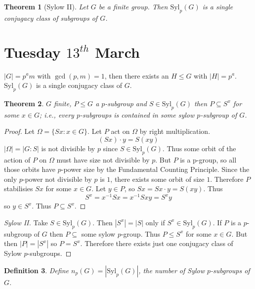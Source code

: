 \documentclass[a4paper,10pt]{article}
\newtheorem{thm}{Theorem}
\newtheorem{Def}[thm]{Definition}
\begin{document}
\begin{thm}[Sylow II]
Let $G$ be a finite group. Then $\text{Syl}_p(G)$ is a single conjugacy class of subgroups of $G$. 
\end{thm}













\newpage
\section{Tuesday $13^{th}$ March}

$|G| = p^a m$ with $\gcd(p, m) =1$, then there exists an $H \leq G$ with $|H| = p^a$. $\text{Syl}_p(G)$ is a single conjugacy class of $G$. 

\begin{thm}
$G$ finite, $P \leq G$ a $p$-subgroup and $S \in \text{Syl}_p(G)$ then $P \subseteq S^x$ for some $x \in G$; i.e., every $p$-subgroups is contained in some sylow $p$-subgroup of $G$.
\end{thm}

\begin{proof}
Let $\Omega = \{ Sx : x \in G\}$. Let $P$ act on $\Omega$ by right multiplication. 
\[ (Sx) \cdot y = S(xy) \]
$|\Omega| = |G : S|$ is not divisible by $p$ since $S \in \text{Syl}_p(G)$. Thus some orbit of the action of $P$ on $\Omega$ must have size not divisible by $p$. But $P$ is a p-group, so all those orbits have $p$-power size by the  Fundamental Counting Principle. Since the only $p$-power not divisible by $p$ is $1$, there exists some orbit of size $1$. Therefore $P$ stabilisies $Sx$ for some $x \in G$. Let $y \in P$, so $Sx = Sx \cdot y = S(xy)$. Thus
\[ S^x = x^{-1} S x = x^{-1} S xy = S^x y \]
so $y \in S^x$. Thus $P \subseteq S^x$.
\end{proof}

\begin{proof}[Sylow II]
Take $S \in \text{Syl}_p(G)$. Then $|S^x| = |S|$ only if $S^x \in \text{Syl}_p(G)$. If $P$ is a $p$-subgroup of $G$ then $P \subseteq $ some sylow $p$-group. Thus $P \leq S^x$ for some $x \in G$. But then $|P| = |S^x|$ so $P = S^x$. Therefore there exists just one conjugacy class of Sylow $p$-subgroups. 
\end{proof}

\begin{Def}
Define $n_p(G) = |\text{Syl}_p(G) |$, the number of Sylow $p$-subgroups of $G$.  
\end{Def}
\end{document}
